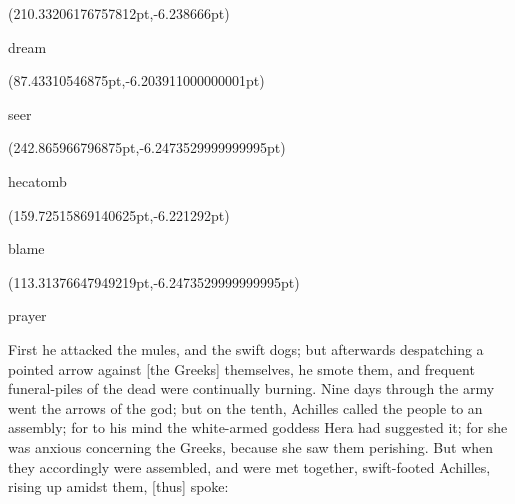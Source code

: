 \documentclass{ransom}
\begin{document}
\begin{foreignpage}
{\begin{textblock*}{24.10562pt}(210.33206176757812pt,\pdfpageheight-206.37759399414062pt-6.238666pt)\parbox[b]{24.10562pt}{\begin{blacktext}\begin{latin}dream\end{latin}\end{blacktext}}\end{textblock*}
\begin{textblock*}{61.90254pt}(87.43310546875pt,\pdfpageheight-206.37759399414062pt-6.203911000000001pt)\parbox[b]{61.90254pt}{\begin{blacktext}\begin{latin}seer\end{latin}\end{blacktext}}\end{textblock*}
\begin{textblock*}{54.07008pt}(242.865966796875pt,\pdfpageheight-152.37759399414062pt-6.2473529999999995pt)\parbox[b]{54.07008pt}{\begin{blacktext}\begin{latin}hecatomb\end{latin}\end{blacktext}}\end{textblock*}
\begin{textblock*}{61.77841pt}(159.72515869140625pt,\pdfpageheight-152.37759399414062pt-6.221292pt)\parbox[b]{61.77841pt}{\begin{blacktext}\begin{latin}blame\end{latin}\end{blacktext}}\end{textblock*}
\begin{textblock*}{42.74962pt}(113.31376647949219pt,\pdfpageheight-152.37759399414062pt-6.2473529999999995pt)\parbox[b]{42.74962pt}{\begin{blacktext}\begin{latin}prayer\end{latin}\end{blacktext}}\end{textblock*}
 }
\end{foreignpage}


First he attacked the mules, and the swift dogs; but
afterwards despatching a pointed arrow against [the Greeks] themselves,
he smote them, and frequent funeral-piles of the dead were continually
burning. Nine days through the army went the arrows of the god; but on
the tenth, Achilles called the people to an assembly; for to his mind
the white-armed goddess Hera had suggested it; for she was anxious
concerning the Greeks, because she saw them perishing. But when they
accordingly were assembled, and were met together, swift-footed
Achilles, rising up amidst them, [thus] spoke:
\end{document}
